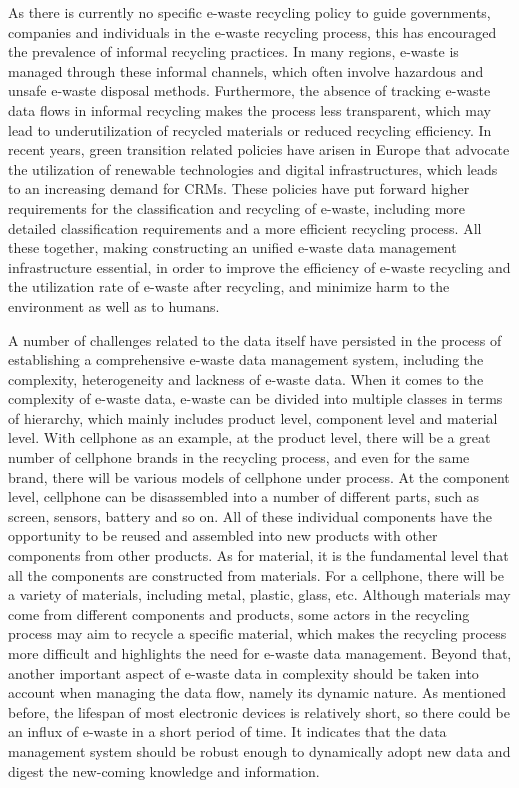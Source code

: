 \documentclass{article}
\numberwithin{equation}{section}
\begin{document}
As there is currently no specific e-waste recycling policy to guide governments, companies and individuals in the e-waste recycling process\cite{ramz08}, this has encouraged the prevalence of informal recycling practices. In many regions, e-waste is managed through these informal channels, which often involve hazardous and unsafe e-waste disposal methods. Furthermore, the absence of tracking e-waste data flows in informal recycling makes the process less transparent, which may lead to underutilization of recycled materials or reduced recycling efficiency. In recent years, green transition related policies have arisen in Europe that advocate the utilization of renewable technologies and digital infrastructures, which leads to an increasing demand for CRMs. These policies have put forward higher requirements for the classification and recycling of e-waste, including more detailed classification requirements and a more efficient recycling process. All these together, making constructing an unified e-waste data management infrastructure essential,  in order to improve the efficiency of e-waste recycling and the utilization rate of e-waste after recycling, and minimize harm to the environment as well as to humans.

A number of challenges related to the data itself have persisted in the process of establishing a comprehensive e-waste data management system, including the complexity, heterogeneity and lackness of e-waste data. When it comes to the complexity of e-waste data\cite{ea22}, e-waste can be divided into multiple classes  in terms of hierarchy, which mainly includes product level, component level and material level. With cellphone as an example, at the product level, there will be a great number of cellphone brands in the recycling process, and even for the same brand, there will be various models of cellphone under process. At the component level, cellphone can be disassembled into a number of different parts, such as screen, sensors, battery and so on. All of these individual components have the opportunity to be reused and assembled into new products with other components from other products. As for material, it is the fundamental level that all the components are constructed from materials. For a cellphone, there will be a variety of materials, including metal, plastic, glass, etc. Although materials may come from different components and products, some actors in the recycling process may aim to recycle a specific material, which makes the recycling process more difficult and highlights the need for e-waste data management. Beyond that, another important aspect of e-waste data in complexity should be taken into account when managing the data flow, namely its dynamic nature. As mentioned before, the lifespan of most electronic devices is relatively short, so there could be an influx of e-waste in a short period of time. It indicates that the data management system should be robust enough to dynamically adopt new data and digest the new-coming knowledge and information.
\end{document}
